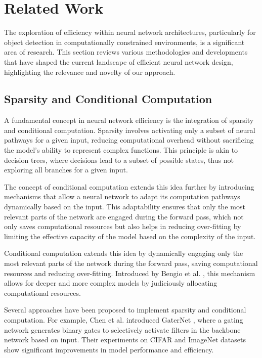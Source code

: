 \section{Related Work}  

The exploration of efficiency within neural network architectures, particularly for object detection in computationally constrained environments, is a significant area of research. This section reviews various methodologies and developments that have shaped the current landscape of efficient neural network design, highlighting the relevance and novelty of our approach.

\subsection{Sparsity and Conditional Computation}

A fundamental concept in neural network efficiency is the integration of sparsity and conditional computation. Sparsity involves activating only a subset of neural pathways for a given input, reducing computational overhead without sacrificing the model's ability to represent complex functions. This principle is akin to decision trees, where decisions lead to a subset of possible states, thus not exploring all branches for a given input.

The concept of conditional computation extends this idea further by introducing mechanisms that allow a neural network to adapt its computation pathways dynamically based on the input. This adaptability ensures that only the most relevant parts of the network are engaged during the forward pass, which not only saves computational resources but also helps in reducing over-fitting by limiting the effective capacity of the model based on the complexity of the input.

Conditional computation extends this idea by dynamically engaging only the most relevant parts of the network during the forward pass, saving computational resources and reducing over-fitting. Introduced by Bengio et al. \cite{bengio2013deep}, this mechanism allows for deeper and more complex models by judiciously allocating computational resources.

Several approaches have been proposed to implement sparsity and conditional computation. For example, Chen et al. introduced GaterNet \cite{chen2019you}, where a gating network generates binary gates to selectively activate filters in the backbone network based on input. Their experiments on CIFAR and ImageNet datasets show significant improvements in model performance and efficiency.

